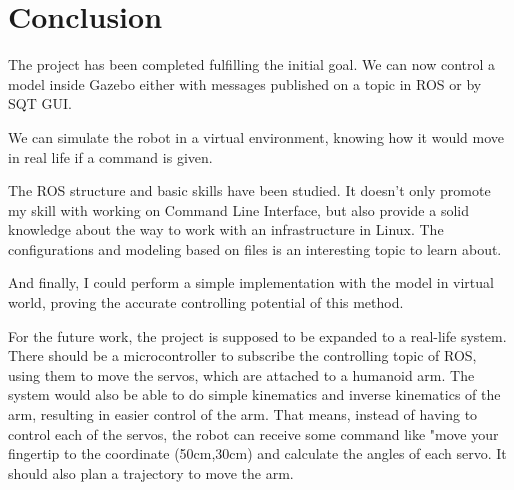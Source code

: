 \documentclass[pdftex,12pt,a4paper]{article}
\begin{document}
  \section{Conclusion}
  The project has been completed fulfilling the initial goal. We can now control a model inside Gazebo either with messages published on a topic in ROS or by SQT GUI.\par
  We can simulate the robot in a virtual environment, knowing how it would move in real life if a command is given.\par
  The ROS structure and basic skills have been studied. It doesn't only promote my skill with working on Command Line Interface, but also provide a solid knowledge about the way to work with an infrastructure in Linux. The configurations and modeling based on files is an interesting topic to learn about.\par
  And finally, I could perform a simple implementation with the model in virtual world, proving the accurate controlling potential of this method.\par
  For the future work, the project is supposed to be expanded to a real-life system. There should be a microcontroller to subscribe the controlling topic of ROS, using them to move the servos, which are attached to a humanoid arm. The system would also be able to do simple kinematics and inverse kinematics of the arm, resulting in easier control of the arm. That means, instead of having to control each of the servos, the robot can receive some command like "move your fingertip to the coordinate (50cm,30cm) and calculate the angles of each servo. It should also plan a trajectory to move the arm.
  
  \newpage
\end{document}
